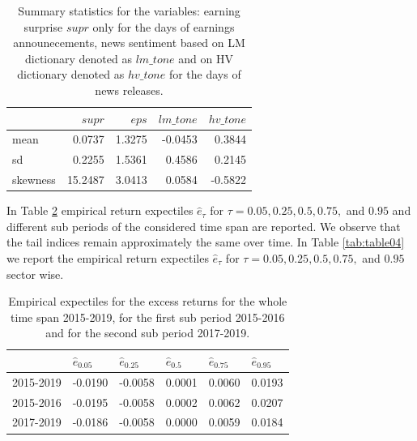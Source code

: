 \documentclass[]{article}
\begin{document}
\begin{table}[hb!]

\caption{\label{tab:table02}Summary statistics for the variables: earning surprise $supr$ only for the days of earnings announecements, news sentiment based on LM dictionary denoted as $lm\_tone$ and on HV dictionary denoted as $hv\_tone$ for the days of news releases.}
\centering
\begin{tabular}[t]{l|r|r|r|r}
\hline
  & $supr$ &$eps$ &$lm\_tone$ & $hv\_tone$ \\
\hline
 mean & 0.0737 & 1.3275 & -0.0453 & 0.3844 \\ 
\hline
sd & 0.2255 & 1.5361 & 0.4586 & 0.2145 \\ 
\hline
 skewness & 15.2487 & 3.0413 & 0.0584 & -0.5822 \\
\hline
\end{tabular}
\end{table}



In Table \ref{tab:table03} empirical return expectiles \(\hat e_{\tau}\) for \(\tau = 0.05,0.25,0.5,0.75,\) and \(0.95\) and different sub periods of the considered time span are reported. We observe that the tail indices remain approximately the same over time. In Table \ref{tab:table04} we report the empirical return expectiles \(\hat e_{\tau}\) for \(\tau = 0.05,0.25,0.5,0.75,\) and \(0.95\) sector wise.

\vspace{-0.5cm}
\begin{table}[h!]

\caption{\label{tab:table03}Empirical expectiles for the excess returns for the whole time span 2015-2019, for the first sub period 2015-2016 and for the second sub period 2017-2019.}
\centering
\begin{tabular}[t]{l|l|l|l|l|l}
\hline
  & $\hat e_{0.05}$ & $\hat e_{0.25}$ & $\hat e_{0.5}$ & $\hat e_{0.75}$ & $\hat e_{0.95}$\\
\hline
2015-2019 & -0.0190 & -0.0058 & 0.0001 & 0.0060 & 0.0193\\
\hline
2015-2016 & -0.0195 & -0.0058 & 0.0002 & 0.0062 & 0.0207\\
\hline
2017-2019 & -0.0186 & -0.0058 & 0.0000 & 0.0059 & 0.0184\\
\hline
\end{tabular}
\end{table}
\end{document}
